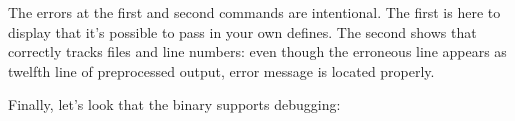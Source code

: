 \documentclass[a4paper,11pt]{article}
\begin{document}
The errors at the first and second commands are intentional.
The first is here to display that it's possible to pass in your own
defines.  The second shows that  correctly tracks
files and line numbers: even though the erroneous line appears as
twelfth line of preprocessed output, error message is located
properly.

Finally, let's look that the binary supports debugging:

\end{document}
